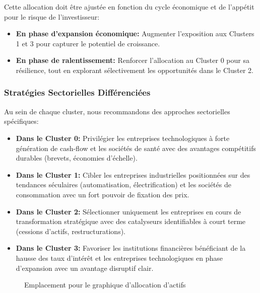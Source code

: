Cette allocation doit être ajustée en fonction du cycle économique et de l'appétit pour le risque de l'investisseur:

\begin{itemize}
    \item \textbf{En phase d'expansion économique:} Augmenter l'exposition aux Clusters 1 et 3 pour capturer le potentiel de croissance.
    
    \item \textbf{En phase de ralentissement:} Renforcer l'allocation au Cluster 0 pour sa résilience, tout en explorant sélectivement les opportunités dans le Cluster 2.
\end{itemize}

\subsubsection{Stratégies Sectorielles Différenciées}
Au sein de chaque cluster, nous recommandons des approches sectorielles spécifiques:

\begin{itemize}
    \item \textbf{Dans le Cluster 0:} Privilégier les entreprises technologiques à forte génération de cash-flow et les sociétés de santé avec des avantages compétitifs durables (brevets, économies d'échelle).
    
    \item \textbf{Dans le Cluster 1:} Cibler les entreprises industrielles positionnées sur des tendances séculaires (automatisation, électrification) et les sociétés de consommation avec un fort pouvoir de fixation des prix.
    
    \item \textbf{Dans le Cluster 2:} Sélectionner uniquement les entreprises en cours de transformation stratégique avec des catalyseurs identifiables à court terme (cessions d'actifs, restructurations).
    
    \item \textbf{Dans le Cluster 3:} Favoriser les institutions financières bénéficiant de la hausse des taux d'intérêt et les entreprises technologiques en phase d'expansion avec un avantage disruptif clair.
\end{itemize}

\begin{figure}[H]
    \centering
    \caption{Emplacement pour le graphique d'allocation d'actifs}
    \label{fig:asset_allocation}
\end{figure}

